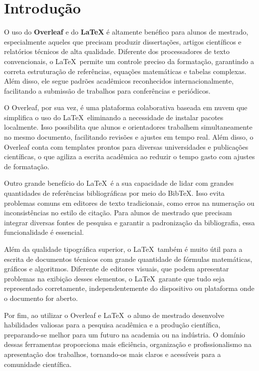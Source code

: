 \section{Introdução}

O uso do \textbf{Overleaf} e do \textbf{LaTeX} é altamente benéfico para alunos de mestrado, especialmente aqueles que precisam produzir dissertações, artigos científicos e relatórios técnicos de alta qualidade. Diferente dos processadores de texto convencionais, o \LaTeX\ permite um controle preciso da formatação, garantindo a correta estruturação de referências, equações matemáticas e tabelas complexas. Além disso, ele segue padrões acadêmicos reconhecidos internacionalmente, facilitando a submissão de trabalhos para conferências e periódicos.  

O Overleaf, por sua vez, é uma plataforma colaborativa baseada em nuvem que simplifica o uso do \LaTeX\, eliminando a necessidade de instalar pacotes localmente. Isso possibilita que alunos e orientadores trabalhem simultaneamente no mesmo documento, facilitando revisões e ajustes em tempo real. Além disso, o Overleaf conta com templates prontos para diversas universidades e publicações científicas, o que agiliza a escrita acadêmica ao reduzir o tempo gasto com ajustes de formatação.  

Outro grande benefício do \LaTeX\ é a sua capacidade de lidar com grandes quantidades de referências bibliográficas por meio do BibTeX. Isso evita problemas comuns em editores de texto tradicionais, como erros na numeração ou inconsistências no estilo de citação. Para alunos de mestrado que precisam integrar diversas fontes de pesquisa e garantir a padronização da bibliografia, essa funcionalidade é essencial.  

Além da qualidade tipográfica superior, o \LaTeX\ também é muito útil para a escrita de documentos técnicos com grande quantidade de fórmulas matemáticas, gráficos e algoritmos. Diferente de editores visuais, que podem apresentar problemas na exibição desses elementos, o \LaTeX\ garante que tudo seja representado corretamente, independentemente do dispositivo ou plataforma onde o documento for aberto.  

Por fim, ao utilizar o Overleaf e \LaTeX\, o aluno de mestrado desenvolve habilidades valiosas para a pesquisa acadêmica e a produção científica, preparando-se melhor para um futuro na academia ou na indústria. O domínio dessas ferramentas proporciona mais eficiência, organização e profissionalismo na apresentação dos trabalhos, tornando-os mais claros e acessíveis para a comunidade científica.





